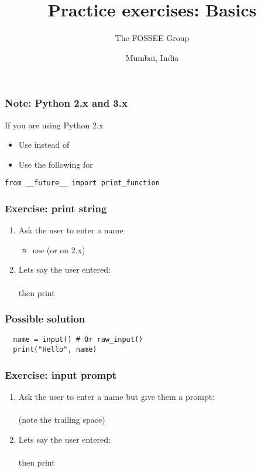 \documentclass[14pt,compress]{beamer}
\title[Basic Python]{Practice exercises: Basics}
\author[FOSSEE Team] {The FOSSEE Group}
\institute[FOSSEE -- IITB] {Department of Aerospace Engineering\\IIT Bombay}
\date[] {Mumbai, India}
\begin{document}
\begin{frame}
  \titlepage
\end{frame}

\begin{frame}
  \frametitle{Note: Python 2.x and 3.x}

 If you are using Python 2.x
  \begin{itemize}
  \item Use  instead of 
  \item Use the following for 
  \end{itemize}
 \begin{lstlisting}
from __future__ import print_function
\end{lstlisting}
\end{frame}

\begin{frame}[plain]
  \frametitle{Exercise: print string}
  \begin{enumerate}
  \item Ask the user to enter a name
    \begin{itemize}
    \item use  (or  on 2.x)
    \end{itemize}
  \item Lets say the user entered: \\ \\  then print \\ 
  \end{enumerate}
\end{frame}

\begin{frame}
\frametitle{Possible solution}
\begin{lstlisting}
  name = input() # Or raw_input()
  print("Hello", name)
\end{lstlisting}

\end{frame}


\begin{frame}[plain]
  \frametitle{Exercise: input prompt}
  \begin{enumerate}
  \item Ask the user to enter a name but give them a prompt:\\  \\ (note the trailing space)
  \item Lets say the user entered: \\ \\  then print \\ 
  \end{enumerate}
\end{frame}
\end{document}
